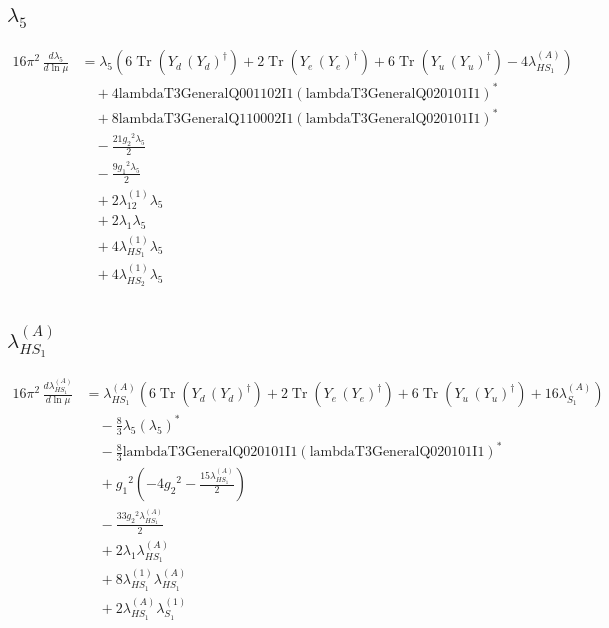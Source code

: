 \documentclass[10pt,a4paper]{article}
\begin{document}
\subsection*{$\lambda_5$}
\begin{align*}
16\pi^2\,\frac{d \lambda_5}{d\ln\mu} &={\lambda_5} (6 \operatorname{Tr}\!\left({Y_d}\,\left({Y_d}\right)^{\dagger}\right)+2 \operatorname{Tr}\!\left({Y_e}\,\left({Y_e}\right)^{\dagger}\right)+6 \operatorname{Tr}\!\left({Y_u}\,\left({Y_u}\right)^{\dagger}\right)-4 {\lambda_{HS_1}^{(A)}}) \\
&\quad +4 \text{lambdaT3GeneralQ001102I1} \left(\text{lambdaT3GeneralQ020101I1}\right)^{*} \\
&\quad +8 \text{lambdaT3GeneralQ110002I1} \left(\text{lambdaT3GeneralQ020101I1}\right)^{*} \\
&\quad -\frac{21 {g_2}^2 {\lambda_5}}{2} \\
&\quad -\frac{9 {g_1}^2 {\lambda_5}}{2} \\
&\quad +2 {\lambda_{12}^{(1)}} {\lambda_5} \\
&\quad +2 {\lambda_1} {\lambda_5} \\
&\quad +4 {\lambda_{HS_1}^{(1)}} {\lambda_5} \\
&\quad +4 {\lambda_{HS_2}^{(1)}} {\lambda_5} \\
\end{align*}
\subsection*{$\lambda_{HS_1}^{(A)}$}
\begin{align*}
16\pi^2\,\frac{d \lambda_{HS_1}^{(A)}}{d\ln\mu} &={\lambda_{HS_1}^{(A)}} (6 \operatorname{Tr}\!\left({Y_d}\,\left({Y_d}\right)^{\dagger}\right)+2 \operatorname{Tr}\!\left({Y_e}\,\left({Y_e}\right)^{\dagger}\right)+6 \operatorname{Tr}\!\left({Y_u}\,\left({Y_u}\right)^{\dagger}\right)+16 {\lambda_{S_1}^{(A)}}) \\
&\quad -\frac{8}{3} {\lambda_5} \left({\lambda_5}\right)^{*} \\
&\quad -\frac{8}{3} \text{lambdaT3GeneralQ020101I1} \left(\text{lambdaT3GeneralQ020101I1}\right)^{*} \\
&\quad +{g_1}^2 \left(-4 {g_2}^2-\frac{15 {\lambda_{HS_1}^{(A)}}}{2}\right) \\
&\quad -\frac{33 {g_2}^2 {\lambda_{HS_1}^{(A)}}}{2} \\
&\quad +2 {\lambda_1} {\lambda_{HS_1}^{(A)}} \\
&\quad +8 {\lambda_{HS_1}^{(1)}} {\lambda_{HS_1}^{(A)}} \\
&\quad +2 {\lambda_{HS_1}^{(A)}} {\lambda_{S_1}^{(1)}} \\
\end{align*}
\end{document}
